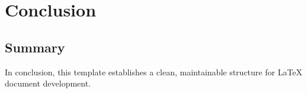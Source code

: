 \chapter{Conclusion}
\label{ch:conclusion}

\section{Summary}
In conclusion, this template establishes a clean, maintainable structure for LaTeX document development.